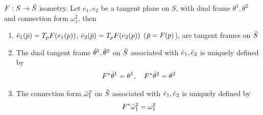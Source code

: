 \documentclass[10pt]{article}
\begin{document}
            \begin{lemma}
                $F:S\rightarrow\Bar{S}$ isometry. Let $e_1,e_2$ be a tangent plane on $S$, with dual frame $\theta^1,\theta^2$ and connection form $\omega_1^2$, then
                \begin{enumerate}
                    \item $\Bar{e}_1(\Bar{p}) = T_pF(e_1(p))$, $\Bar{e}_2(\Bar{p}) = T_pF(e_2(p))$ \big($\Bar{p} = F(p)$\big), are tangent frames on $\Bar{S}$
                    \item The dual tangent frame $\Bar{\theta}^1,\Bar{\theta}^2$ on $\Bar{S}$ associated with $\Bar{e}_1, \Bar{e}_2$ is uniquely defined by 
                    \begin{equation*}
                        \begin{aligned}
                            F^*\Bar{\theta}^1 = \theta^1, \quad F^*\Bar{\theta}^2 = \theta^2
                        \end{aligned}
                    \end{equation*}
                    \item The connection form $\Bar{\omega}_1^2$ on $\Bar{S}$ associated with $\Bar{e}_1,\Bar{e}_2$ is uniquely defined by 
                    \begin{equation*}
                        \begin{aligned}
                            F^*\Bar{\omega}_1^2 = \omega_1^2
                        \end{aligned}
                    \end{equation*}
                \end{enumerate}
            \end{lemma}         
\end{document}

